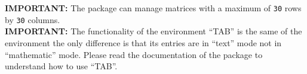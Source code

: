 \documentclass[a4paper,final,11pt]{article}
\begin{document}
\textbf{IMPORTANT:} The package can manage matrices with a maximum 
of \verb|30| rows by \verb|30| columns.\\
%
\textbf{IMPORTANT:} The functionality of the environment ``TAB'' is 
the same of the environment  the only difference is that its 
entries are in ``text'' mode not in ``mathematic'' mode. Please read 
the documentation of the package  to understand
how to use ``TAB''.
\end{document}
